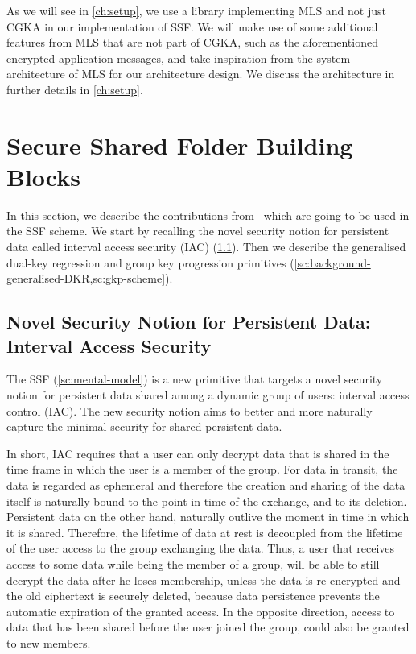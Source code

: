 As we will see in \cref{ch:setup}, we use a library implementing MLS and not just CGKA in our implementation of SSF.
We will make use of some additional features from MLS that are not part of CGKA, such as the
aforementioned encrypted application messages,
and take inspiration from the system architecture of MLS for our architecture design.
We discuss the architecture in further details in \cref{ch:setup}.

\section{Secure Shared Folder Building Blocks}\label{sc:SSF}

In this section, we describe the
contributions from~\cite{GKP}
which are going to be used
in the SSF scheme.
We start by recalling the novel security notion for persistent
data called interval access security (IAC) (\cref{sc:iac}).
Then we describe the generalised dual-key regression and group key progression primitives
(\cref{sc:background-generalised-DKR,sc:gkp-scheme}).

\subsection{Novel Security Notion for Persistent Data: Interval Access Security}\label{sc:iac}

The SSF (\cref{sc:mental-model}) is a new primitive that targets a novel security 
notion for persistent data shared among a dynamic 
group of users: interval access control (IAC).
The new security notion aims to better and more naturally
capture the minimal security for shared persistent data.

In short, IAC requires that a user can only decrypt data that
is shared in the time frame in which the user is a member
of the group. For data in transit, the data is regarded as
ephemeral and therefore the creation and sharing of the data
itself is naturally bound to the point in time of the exchange,
and to its deletion. Persistent data on the other hand, naturally
outlive the moment in time in which it is shared.
Therefore, the lifetime of data at rest is decoupled from the
lifetime of the user access to the group exchanging the data.
Thus, a user that receives access to some data while being the
member of a group, will be able to still decrypt the data
after he loses membership, unless the data is re-encrypted
and the old ciphertext is securely deleted, because data persistence prevents the automatic expiration of the granted access.
In the opposite direction, access to data that has been
shared before the user joined the group, could also be granted
to new members.

